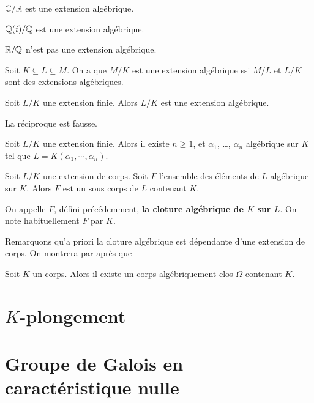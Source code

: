 \begin{exemple}
	$\mathbb{C}/\mathbb{R}$ est une extension algébrique.

	$\mathbb{Q}(i)/\mathbb{Q}$ est une extension algébrique.

	$\mathbb{R}/\mathbb{Q}$ n'est pas une extension algébrique.
\end{exemple}

\begin{proposition}
	Soit $K \subseteq L \subseteq M$. On a que $M/K$ est une extension
	algébrique ssi $M/L$ et $L/K$ sont des extensions algébriques.
\end{proposition}

\begin{proposition}
	Soit $L/K$ une extension finie. Alors $L/K$ est une extension algébrique.
\end{proposition}

\begin{remarque}
	La réciproque est fausse.
\end{remarque}

\begin{proposition}
	Soit $L/K$ une extension finie. Alors il existe $n \geq 1$, et $\alpha_{1}$,
	\ldots, $\alpha_{n}$ algébrique sur $K$ tel que $L = K(\alpha_{1}, \cdots,
	\alpha_{n})$.
\end{proposition}

\begin{proposition}
	Soit $L/K$ une extension de corps.
	Soit $F$ l'ensemble des éléments de $L$ algébrique sur $K$.
	Alors $F$ est un sous corps de $L$ contenant $K$.
\end{proposition}

\begin{definition}
	On appelle $F$, défini précédemment, \textbf{la cloture algébrique de $K$
	sur $L$}.
	On note habituellement $F$ par $\overline{K}$.
\end{definition}

Remarquons qu'a priori la cloture algébrique est dépendante d'une extension de corps. On
montrera par après que 
\begin{theorem}
	Soit $K$ un corps. Alors il existe un corps algébriquement clos $\Omega$
	contenant $K$.
\end{theorem}

\section{$K$-plongement}

\section{Groupe de Galois en caractéristique nulle}
